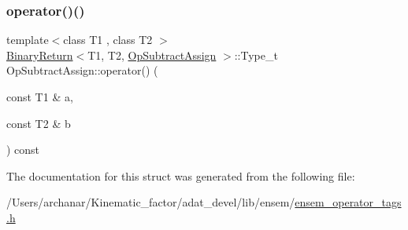 \mbox{\label{structOpSubtractAssign_aad45a22054a0f7d5a0fd7c283e84661d}} 
\subsubsection{\texorpdfstring{operator()()}{operator()()}\hspace{0.1cm}{\footnotesize\ttfamily [2/2]}}
{\footnotesize\ttfamily template$<$class T1 , class T2 $>$ \\
\mbox{\hyperlink{structBinaryReturn}{Binary\+Return}}$<$T1, T2, \mbox{\hyperlink{structOpSubtractAssign}{Op\+Subtract\+Assign}} $>$\+::Type\+\_\+t Op\+Subtract\+Assign\+::operator() (\begin{DoxyParamCaption}\item[{const T1 \&}]{a,  }\item[{const T2 \&}]{b }\end{DoxyParamCaption}) const\hspace{0.3cm}{\ttfamily [inline]}}



The documentation for this struct was generated from the following file\+:\begin{DoxyCompactItemize}
\item 
/\+Users/archanar/\+Kinematic\+\_\+factor/adat\+\_\+devel/lib/ensem/\mbox{\hyperlink{lib_2ensem_2ensem__operator__tags_8h}{ensem\+\_\+operator\+\_\+tags.\+h}}\end{DoxyCompactItemize}
